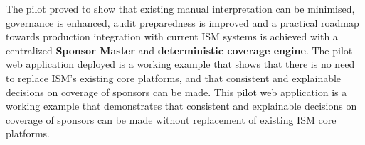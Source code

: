 \begin{abstractwithpageno}
The pilot proved to show that existing manual interpretation can be minimised, governance is enhanced, audit preparedness is improved and a practical roadmap towards production integration with current ISM systems is achieved with a centralized \textbf{Sponsor Master} and \textbf{deterministic coverage engine}. The pilot web application deployed is a working example that shows that there is no need to replace ISM's existing core platforms, and that consistent and explainable decisions on coverage of sponsors can be made. This pilot web application is a working example that demonstrates that consistent and explainable decisions on coverage of sponsors can be made without replacement of existing ISM core platforms.
\end{abstractwithpageno}